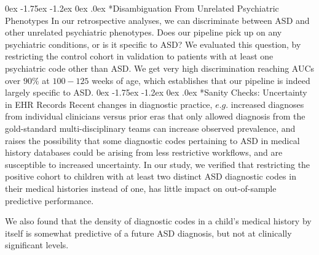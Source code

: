 \documentclass[onecolumn, compsoc,11pt]{IEEEtran}
\makeatletter
\renewcommand\subsection{\@startsection {subsection}{2}{\z@}%
                                   {0ex \@plus -1.75ex \@minus -1.2ex}%
                                   {0ex \@plus.0ex}%
                                   {\fontsize{11}{11}\selectfont\bfseries\sffamily\color{black}}}
\def\treatment{positive\xspace}
\makeatother
\begin{document}
\subsection*{Disambiguation From Unrelated Psychiatric Phenotypes}
%
In our retrospective analyses,  we can discriminate between ASD and other unrelated psychiatric phenotypes. Does our pipeline pick up on any psychiatric conditions, or is it specific to ASD? We  evaluated this question, by restricting the  control  cohort in validation to  patients with at least one psychiatric code other than ASD. We get very high discrimination reaching AUCs over $90\%$ at $100-125$ weeks of age, which establishes that our pipeline is indeed largely specific to ASD.
%
\subsection*{Sanity Checks: Uncertainty in EHR Records}
Recent changes in diagnostic practice, $e.g.$ increased diagnoses from individual clinicians versus prior eras that only allowed diagnosis from the gold-standard multi-disciplinary teams can  increase observed   prevalence, and  raises the possibility that  some diagnostic codes pertaining to ASD in medical history databases could be arising from less restrictive workflows, and  are susceptible to increased uncertainty.  In our study, we verified that restricting the \treatment cohort to children with at least two  distinct ASD diagnostic codes in their medical histories instead of one, has little impact on  out-of-sample predictive performance.
 
We also found that the density of diagnostic codes in a child's medical history by itself is somewhat predictive of a future ASD diagnosis, but not at clinically significant levels.






\end{document}
